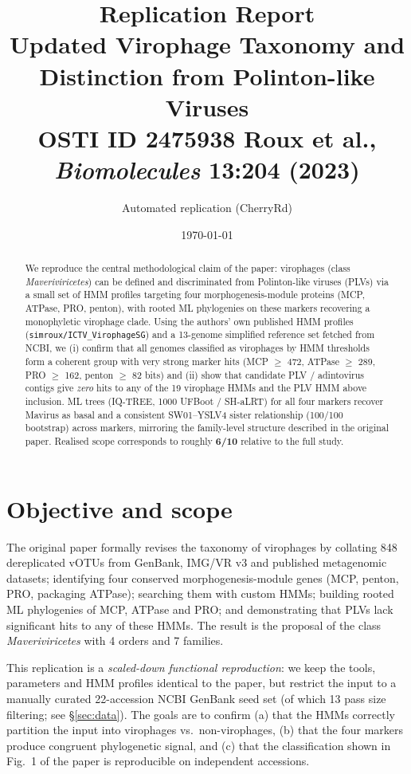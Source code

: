 \documentclass[11pt,a4paper]{article}
\title{\textbf{Replication Report}\\[0.3em]
\large Updated Virophage Taxonomy and Distinction from Polinton-like Viruses\\[0.2em]
\normalsize OSTI ID 2475938 \textemdash{} Roux et al., \emph{Biomolecules} 13:204 (2023)}
\author{Automated replication (CherryRd)}
\date{\today}
\begin{document}
\maketitle

\begin{abstract}
\noindent We reproduce the central methodological claim of the paper:
virophages (class \emph{Maveriviricetes}) can be defined and discriminated from
Polinton-like viruses (PLVs) via a small set of HMM profiles targeting four
morphogenesis-module proteins (MCP, ATPase, PRO, penton), with rooted ML
phylogenies on these markers recovering a monophyletic virophage clade. Using
the authors' own published HMM profiles
(\texttt{simroux/ICTV\_VirophageSG}) and a 13-genome simplified reference set
fetched from NCBI, we (i) confirm that all genomes classified as virophages by
HMM thresholds form a coherent group with very strong marker hits
(MCP $\geq$ 472, ATPase $\geq$ 289, PRO $\geq$ 162, penton $\geq$ 82 bits) and
(ii) show that candidate PLV / adintovirus contigs give \emph{zero} hits to
any of the 19 virophage HMMs and the PLV HMM above inclusion. ML trees
(IQ-TREE, 1000 UFBoot / SH-aLRT) for all four markers recover Mavirus as
basal and a consistent \mbox{SW01--YSLV4} sister relationship
(100/100 bootstrap) across markers, mirroring the family-level structure
described in the original paper. Realised scope corresponds to roughly
\textbf{6/10} relative to the full study.
\end{abstract}

\section{Objective and scope}

The original paper formally revises the taxonomy of virophages by collating
848 dereplicated vOTUs from GenBank, IMG/VR v3 and published metagenomic
datasets; identifying four conserved morphogenesis-module genes (MCP, penton,
PRO, packaging ATPase); searching them with custom HMMs; building rooted ML
phylogenies of MCP, ATPase and PRO; and demonstrating that PLVs lack
significant hits to any of these HMMs. The result is the proposal of the
class \emph{Maveriviricetes} with 4 orders and 7 families.

This replication is a \emph{scaled-down functional reproduction}: we keep the
tools, parameters and HMM profiles identical to the paper, but restrict the
input to a manually curated 22-accession NCBI GenBank seed set (of which 13
pass size filtering; see \S\ref{sec:data}). The goals are to confirm
(a) that the HMMs correctly partition the input into virophages vs.\ non-virophages,
(b) that the four markers produce congruent phylogenetic signal, and
(c) that the classification shown in Fig.~1 of the paper is reproducible on
independent accessions.
\end{document}
